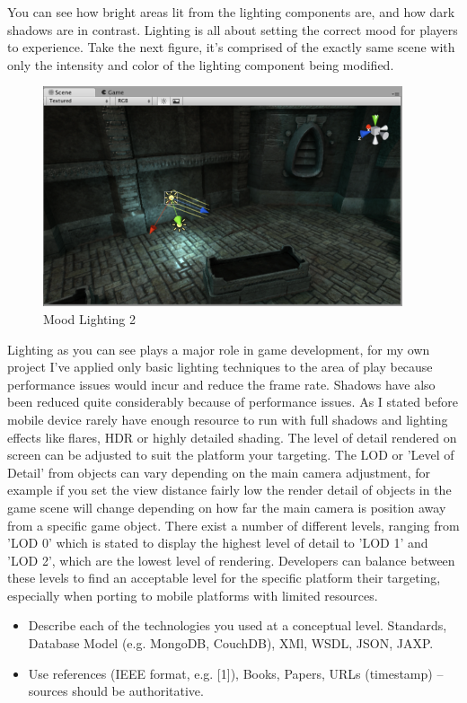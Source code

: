 You can see how bright areas lit from the lighting components are, and how dark shadows are in contrast. Lighting is all about setting the correct mood for players to experience. Take the next figure, it's comprised of the exactly same scene with only the intensity and color of the lighting component being modified.

\begin{figure}[!ht]
	\caption{Mood Lighting 2}
	\centering
	\includegraphics{img/light-mood-2.png}
\end{figure}

Lighting as you can see plays a major role in game development, for my own project I've applied only basic lighting techniques to the area of play because performance issues would incur and reduce the frame rate. Shadows have also been reduced quite considerably because of performance issues. As I stated before mobile device rarely have enough resource to run with full shadows and lighting effects like flares, HDR or highly detailed shading.
The level of detail rendered on screen can be adjusted to suit the platform your targeting. The LOD or 'Level of Detail' from objects can vary depending on the main camera adjustment, for example if you set the view distance fairly low the render detail of objects in the game scene will change depending on how far the main camera is position away from a specific game object. There exist a number of different levels, ranging from 'LOD 0' which is stated to display the highest level of detail to 'LOD 1' and 'LOD 2', which are the lowest level of rendering. Developers can balance between these levels to find an acceptable level for the specific platform their targeting, especially when porting to mobile platforms with limited resources.

\begin{itemize}
\item Describe each of the technologies you used at a conceptual level. Standards, Database Model (e.g. MongoDB, CouchDB), XMl, WSDL, JSON, JAXP.
\item Use references (IEEE format, e.g. [1]), Books, Papers, URLs (timestamp) – sources should be authoritative. 
\end{itemize}

